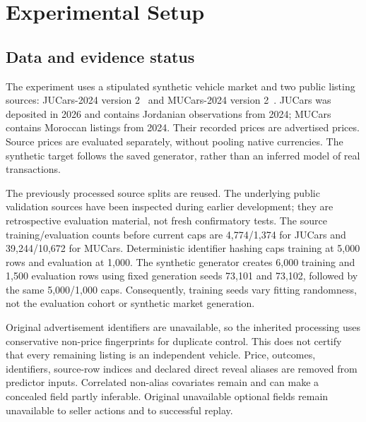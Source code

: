 \section{Experimental Setup}
\subsection{Data and evidence status}
The experiment uses a stipulated synthetic vehicle market and two public
listing sources: JUCars-2024 version 2~\cite{thalji2026jucars} and
MUCars-2024 version 2~\cite{tabarnoust2024mucars}. JUCars was deposited in
2026 and contains Jordanian observations from 2024; MUCars contains
Moroccan listings from 2024. Their recorded prices are advertised prices.
Source prices are evaluated separately, without pooling native currencies.
The synthetic target follows the saved generator, rather than an inferred
model of real transactions.

The previously processed source splits are reused. The underlying public
validation sources have been inspected during earlier development; they
are retrospective evaluation material, not fresh confirmatory tests.
The source training/evaluation counts before current caps are 4,774/1,374
for JUCars and 39,244/10,672 for MUCars. Deterministic identifier hashing
caps training at 5,000 rows and evaluation at 1,000. The synthetic
generator creates 6,000 training and 1,500 evaluation rows using fixed
generation seeds 73,101 and 73,102, followed by the same 5,000/1,000 caps.
Consequently, training seeds vary fitting randomness, not the evaluation
cohort or synthetic market generation.

Original advertisement identifiers are unavailable, so the inherited
processing uses conservative non-price fingerprints for duplicate control.
This does not certify that every remaining listing is an independent
vehicle. Price, outcomes, identifiers, source-row indices and declared
direct reveal aliases are removed from predictor inputs. Correlated
non-alias covariates remain and can make a concealed field partly
inferable. Original unavailable optional fields remain unavailable to
seller actions and to successful replay.

